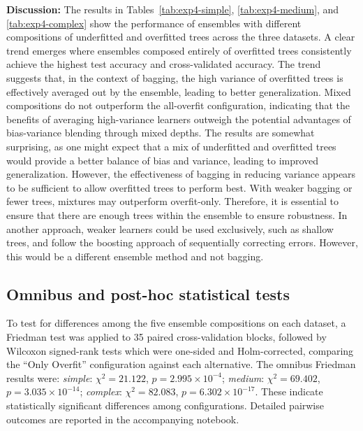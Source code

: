 \documentclass[conference]{IEEEtran}
\begin{document}
\textbf{Discussion:}
 The results in Tables~\ref{tab:exp4-simple}, \ref{tab:exp4-medium}, and \ref{tab:exp4-complex} show the performance of ensembles with different compositions of underfitted and overfitted trees across the three datasets. A clear trend emerges where ensembles composed entirely of overfitted trees consistently achieve the highest test accuracy and cross-validated accuracy. The trend suggests that, in the context of bagging, the high variance of overfitted trees is effectively averaged out by the ensemble, leading to better generalization. Mixed compositions do not outperform the all-overfit configuration, indicating that the benefits of averaging high-variance learners outweigh the potential advantages of bias-variance blending through mixed depths. The results are somewhat surprising, as one might expect that a mix of underfitted and overfitted trees would provide a better balance of bias and variance, leading to improved generalization. However, the effectiveness of bagging in reducing variance appears to be sufficient to allow overfitted trees to perform best. With weaker bagging or fewer trees, mixtures may outperform overfit-only. Therefore, it is essential to ensure that there are enough trees within the ensemble to ensure robustness. In another approach, weaker learners could be used exclusively, such as shallow trees, and follow the boosting approach of sequentially correcting errors. However, this would be a different ensemble method and not bagging.

 \subsection{Omnibus and post-hoc statistical tests}
To test for differences among the five ensemble compositions on each dataset, a Friedman test was applied to 35 paired cross-validation blocks, followed by Wilcoxon signed-rank tests which were one-sided and Holm-corrected, comparing the ``Only Overfit'' configuration against each alternative. The omnibus Friedman results were: \textit{simple}: $\chi^2=21.122$, $p=2.995\times10^{-4}$; \textit{medium}: $\chi^2=69.402$, $p=3.035\times10^{-14}$; \textit{complex}: $\chi^2=82.083$, $p=6.302\times10^{-17}$. These indicate statistically significant differences among configurations. Detailed pairwise outcomes are reported in the accompanying notebook.
\end{document}

